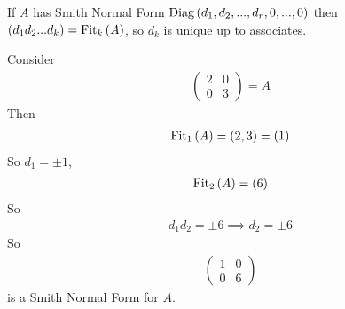 \documentclass[a4paper]{article}
\begin{document}
\begin{coro}
If $A$ has Smith Normal Form $\operatorname{Diag}\left(d_1,d_2,...,d_r,0,...,0\right)$ then $\left(d_1 d_2 ... d_k\right) = \operatorname{Fit}_k\left(A\right)$, so $d_k$ is unique up to associates.
\end{coro}

\begin{eg}
Consider
\begin{equation*}
\begin{aligned}
\left(\begin{matrix}
2&0\\
0&3
\end{matrix}\right) = A
\end{aligned}
\end{equation*}
Then
\begin{equation*}
\begin{aligned}
\operatorname{Fit}_1\left(A\right) = \left(2,3\right) = \left(1\right)
\end{aligned}
\end{equation*}
So $d_1 = \pm 1$,
\begin{equation*}
\begin{aligned}
\operatorname{Fit}_2\left(A\right) = \left(6\right)
\end{aligned}
\end{equation*}
So
\begin{equation*}
\begin{aligned}
d_1 d_2 = \pm 6 \implies d_2 = \pm 6
\end{aligned}
\end{equation*}
So
\begin{equation*}
\begin{aligned}
\left(\begin{matrix}
1& 0\\
0& 6
\end{matrix}\right)
\end{aligned}
\end{equation*}
is a Smith Normal Form for $A$.
\end{eg}
\end{document}
